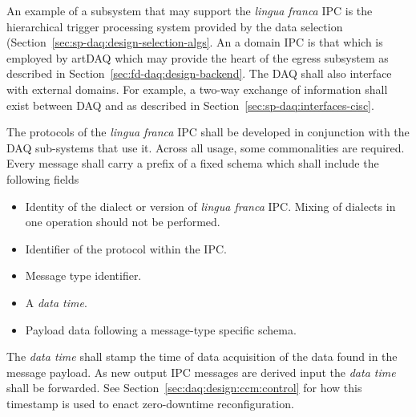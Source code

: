An example of a subsystem that may support the \textit{lingua franca} IPC is the hierarchical trigger processing system provided by the data selection (Section~\ref{sec:sp-daq:design-selection-algs}. 
An a domain IPC is that which is employed by artDAQ which may provide the heart of the egress subsystem as described in Section~\ref{sec:fd-daq:design-backend}.
The DAQ shall also interface with external domains. 
For example, a two-way exchange of information shall exist between DAQ and  as described in Section~\ref{sec:sp-daq:interfaces-cisc}.  

The protocols of the \textit{lingua franca} IPC shall be developed in conjunction with the DAQ sub-systems that use it. 
Across all usage, some commonalities are required. 
Every message shall carry a prefix of a fixed schema which shall include the following fields

\begin{itemize}
\item Identity of the dialect or version of \textit{lingua franca} IPC.  Mixing of dialects in one operation should not be performed.
\item Identifier of the protocol within the IPC.
\item Message type identifier.
\item A \textit{data time}.
\item Payload data following a message-type specific schema.
\end{itemize}

The \textit{data time} shall stamp the time of data acquisition of the data found in the message payload. 
As new output IPC messages are derived input the \textit{data time} shall be forwarded.
See Section~\ref{sec:daq:design:ccm:control} for how this timestamp is used to enact zero-downtime reconfiguration.




